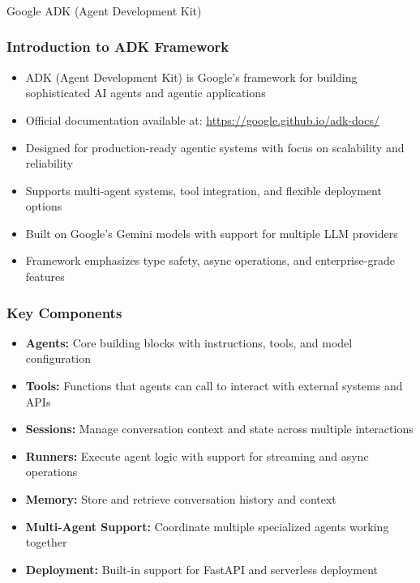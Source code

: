 \begin{frame}[fragile]\frametitle{}
\begin{center}
{\Large Google ADK (Agent Development Kit)}
\end{center}
\end{frame}

\begin{frame}[fragile]\frametitle{Introduction to ADK Framework}
      \begin{itemize}
	\item ADK (Agent Development Kit) is Google's framework for building sophisticated AI agents and agentic applications
	\item Official documentation available at: \url{https://google.github.io/adk-docs/}
	\item Designed for production-ready agentic systems with focus on scalability and reliability
	\item Supports multi-agent systems, tool integration, and flexible deployment options
	\item Built on Google's Gemini models with support for multiple LLM providers
	\item Framework emphasizes type safety, async operations, and enterprise-grade features
	  \end{itemize}
\end{frame}

\begin{frame}[fragile]\frametitle{Key Components}

    \begin{itemize}
	\item \textbf{Agents:} Core building blocks with instructions, tools, and model configuration
	\item \textbf{Tools:} Functions that agents can call to interact with external systems and APIs
	\item \textbf{Sessions:} Manage conversation context and state across multiple interactions
	\item \textbf{Runners:} Execute agent logic with support for streaming and async operations
	\item \textbf{Memory:} Store and retrieve conversation history and context
	\item \textbf{Multi-Agent Support:} Coordinate multiple specialized agents working together
	\item \textbf{Deployment:} Built-in support for FastAPI and serverless deployment
	  \end{itemize}
\end{frame}

